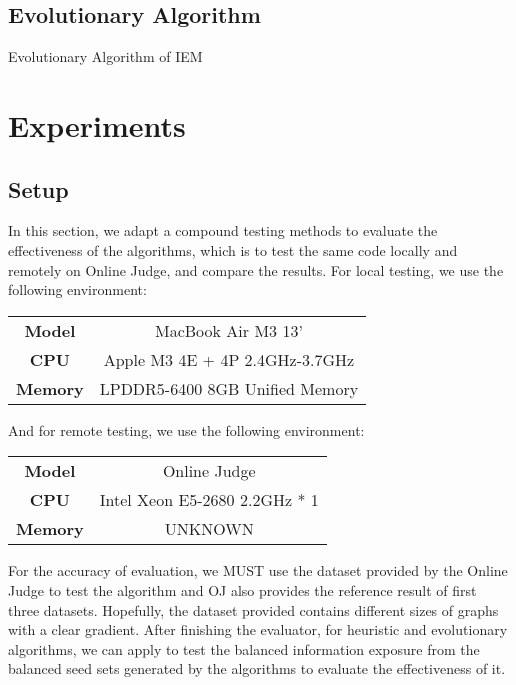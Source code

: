 \documentclass{article}
\begin{document}
\subsection{Evolutionary Algorithm}

\begin{algorithm}
\caption{Evolutionary Algorithm of IEM}\label{alg:evolutionary}
\end{algorithm}

\section{Experiments}
\subsection{Setup}
In this section, we adapt a compound testing methods to evaluate the effectiveness of the algorithms, which is to test the same code locally and remotely on Online Judge, and compare the results. For local testing, we use the following environment:
\begin{table}[!htbp]
    \begin{center}
    \begin{tabular}[c]{cc}
        \textbf{Model} & MacBook Air M3 13' \\
        \textbf{CPU} & Apple M3 4E + 4P 2.4GHz-3.7GHz \\
        \textbf{Memory} & LPDDR5-6400 8GB Unified Memory
    \end{tabular}
    \end{center}
\end{table}

And for remote testing, we use the following environment:

\begin{table}[!htbp]
    \begin{center}
    \begin{tabular}[c]{cc}
        \textbf{Model} & Online Judge \\
        \textbf{CPU} & Intel Xeon E5-2680 2.2GHz * 1 \\
        \textbf{Memory} & UNKNOWN
    \end{tabular}
    \end{center}
\end{table}

For the accuracy of evaluation, we MUST use the dataset provided by the Online Judge to test the algorithm and OJ also provides the reference result of first three datasets. Hopefully, the dataset provided contains different sizes of graphs with a clear gradient. After finishing the evaluator, for heuristic and evolutionary algorithms, we can apply to test the balanced information exposure from the balanced seed sets generated by the algorithms to evaluate the effectiveness of it.
\end{document}
